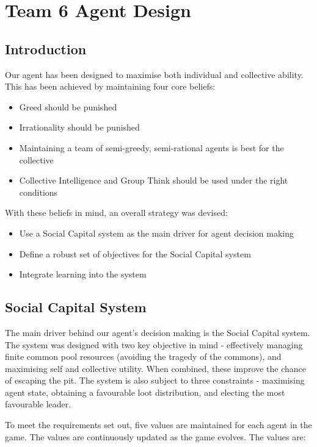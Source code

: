 \chapter{Team 6 Agent Design}\label{team_6_agent_design}

\section{Introduction}

Our agent has been designed to maximise both individual and collective ability. This has been achieved by maintaining four core beliefs:

\begin{itemize}
    \item Greed should be punished
    \item Irrationality should be punished
    \item Maintaining a team of semi-greedy, semi-rational agents is best for the collective
    \item Collective Intelligence and Group Think should be used under the right conditions
\end{itemize}
With these beliefs in mind, an overall strategy was devised:
\begin{itemize}
    \item Use a Social Capital system as the main driver for agent decision making
    \item Define a robust set of objectives for the Social Capital system
    \item Integrate learning into the system
\end{itemize}

\section{Social Capital System}

The main driver behind our agent's decision making is the Social Capital system. The system was designed with two key objective in mind - effectively managing finite common pool resources (avoiding the tragedy of the commons), and maximising self and collective utility. When combined, these improve the chance of escaping the pit. The system is also subject to three constraints - maximising agent state, obtaining a favourable loot distribution, and electing the most favourable leader.

To meet the requirements set out, five values are maintained for each agent in the game. The values are continuously updated as the game evolves. The values are:

